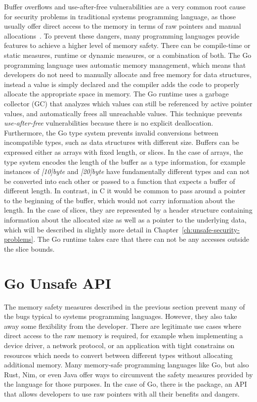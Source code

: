Buffer overflows and use-after-free vulnerabilities are a very common root cause for security problems in traditional
systems programming language, as those usually offer direct access to the memory in terms of raw pointers and manual
allocations~\cite{larochelle2001}.
To prevent these dangers, many programming languages provide features to achieve a higher level of memory safety.
There can be compile-time or static measures, runtime or dynamic measures, or a combination of both.
The Go programming language uses automatic memory management, which means that developers do not need to manually
allocate and free memory for data structures, instead a value is simply declared and the compiler adds the code to
properly allocate the appropriate space in memory.
The Go runtime uses a garbage collector (\acrshort{GC}) that analyzes which values can still be referenced by active
pointer values, and automatically frees all unreachable values.
This technique prevents \textit{use-after-free} vulnerabilities because there is no explicit deallocation.
Furthermore, the Go type system prevents invalid conversions between incompatible types, such as data structures with
different size.
Buffers can be expressed either as arrays with fixed length, or slices.
In the case of arrays, the type system encodes the length of the buffer as a type information, for example instances
of \textit{[10]byte} and \textit{[20]byte} have fundamentally different types and can not be converted into each other
or passed to a function that expects a buffer of different length.
In contrast, in C it would be common to pass around a pointer to the beginning of the buffer, which would not carry
information about the length.
In the case of slices, they are represented by a header structure containing information about the allocated size as
well as a pointer to the underlying data, which will be described in slightly more detail in
Chapter~\ref{ch:unsafe-security-problems}.
The Go runtime takes care that there can not be any accesses outside the slice bounds.



\section{Go Unsafe API}\label{sec:background:unsafe-api}

The memory safety measures described in the previous section prevent many of the bugs typical to systems programming
languages.
However, they also take away some flexibility from the developer.
There are legitimate use cases where direct access to the raw memory is required, for example when implementing a
device driver, a network protocol, or an application with tight constrains on resources which needs to convert between
different types without allocating additional memory.
Many memory-safe programming languages like Go, but also Rust, Nim, or even Java offer ways to circumvent the safety
measures provided by the language for those purposes.
In the case of Go, there is the \unsafe{} package, an \acrshort{API} that allows developers to use raw pointers with
all their benefits and dangers.

